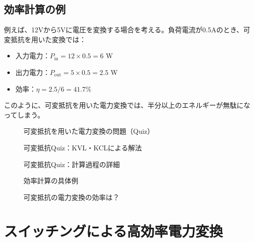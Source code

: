 \subsection{効率計算の例}

例えば、12Vから5Vに電圧を変換する場合を考える。負荷電流が0.5Aのとき、可変抵抗を用いた変換では：

\begin{itemize}
\item 入力電力：$P_{\text{in}} = 12 \times 0.5 = 6$ W
\item 出力電力：$P_{\text{out}} = 5 \times 0.5 = 2.5$ W
\item 効率：$\eta = 2.5/6 = 41.7$\%
\end{itemize}

このように、可変抵抗を用いた電力変換では、半分以上のエネルギーが無駄になってしまう。

\begin{figure}[H]
\centering
{}
\caption{可変抵抗を用いた電力変換の問題（Quiz）}
\label{fig:resistor_quiz}
\end{figure}

\begin{figure}[H]
\centering
{}
\caption{可変抵抗Quiz：KVL・KCLによる解法}
\label{fig:resistor_quiz_solution}
\end{figure}

\begin{figure}[H]
\centering
{}
\caption{可変抵抗Quiz：計算過程の詳細}
\label{fig:resistor_calculation}
\end{figure}

\begin{figure}[H]
\centering
{}
\caption{効率計算の具体例}
\label{fig:efficiency_calculation}
\end{figure}

\begin{figure}[H]
\centering
{}
\caption{可変抵抗の電力変換の効率は？}
\label{fig:resistor_efficiency}
\end{figure}

\section{スイッチングによる高効率電力変換}

